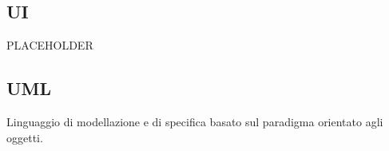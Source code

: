 \documentclass[../glossario.tex]{subfiles}
\begin{document}
\subsection*{UI}
PLACEHOLDER


\subsection*{UML}
Linguaggio di modellazione e di specifica basato sul paradigma orientato agli oggetti.

    
\end{document}
